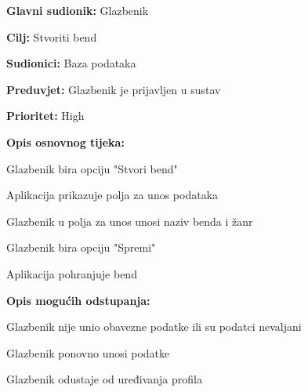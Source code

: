 \noindent {}
	\begin{packed_item}
		
		\item \textbf{Glavni sudionik:} Glazbenik 
		\item \textbf{Cilj:} Stvoriti bend
		\item \textbf{Sudionici:} Baza podataka
		\item \textbf{Preduvjet:} Glazbenik je prijavljen u sustav
		\item \textbf{Prioritet:} High
		\item \textbf{Opis osnovnog tijeka:} 
		
		\item[] \begin{packed_enum}
			
			\item Glazbenik bira opciju "Stvori bend"
			\item Aplikacija prikazuje polja za unos podataka
			\item Glazbenik u polja za unos unosi naziv benda i žanr
			\item Glazbenik bira opciju "Spremi"
			\item Aplikacija pohranjuje bend
		\end{packed_enum}
	
		\item  \textbf{Opis mogućih odstupanja:}
		\item[] \begin{packed_item}
			
			\item[4.a] Glazbenik nije unio obavezne podatke ili su podatci nevaljani
			\item[] \begin{packed_enum}
				
				\item Glazbenik ponovno unosi podatke
				\item Glazbenik odustaje od uređivanja profila
				
			\end{packed_enum}	
		\end{packed_item}
	\end{packed_item}

